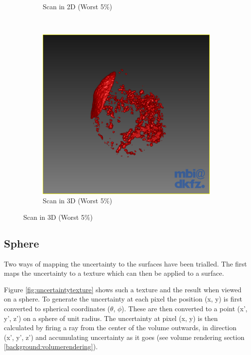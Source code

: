 \begin{figure}[H]
\begin{subfigure}[b]{0.5\textwidth}
    \caption{Scan in 2D (Worst 5$\%$)}
    \label{fig:thresholdingresultsscan2d}
  \end{subfigure}%
  ~ %
  \begin{subfigure}[b]{0.5\textwidth}
    \includegraphics[width=\textwidth]{images/thresholding/results/scan_3d.png}
    \caption{Scan in 3D (Worst 5$\%$)}
    \label{fig:thresholdingresultsscan3d}
  \end{subfigure}
\end{figure}

\clearpage
\subsection{Sphere}
Two ways of mapping the uncertainty to the surfaces have been trialled. The first maps the uncertainty to a texture which can then be applied to a surface. 

Figure \ref{fig:uncertaintytexture} shows such a texture and the result when viewed on a sphere. To generate the uncertainty at each pixel the position (x, y) is first converted to spherical coordinates ($\theta$, $\phi$). These are then converted to a point (x', y', z') on a sphere of unit radius. The uncertainty at pixel (x, y) is then calculated by firing a ray from the center of the volume outwards, in direction (x', y', z') and accumulating uncertainty as it goes (see volume rendering section \ref{background:volumerendering}).

